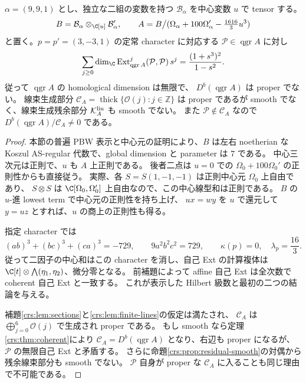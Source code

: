 \begin{proposition}
\label{cmo:prop:rational-singular}
$\alpha=(9,9,1)$ とし、独立な二組の変数を持つ
$\mathcal B_\alpha$ を中心変数 $u$ で tensor する。
\[
 B=\mathcal B_\alpha\otimes_{\C[u]}\mathcal B_\alpha',\qquad
 A=B\big/(\Omega_\alpha+100\Omega_\alpha'-\tfrac{1616}{3}u^3)
\]
と置く。$p=p'=(3,-3,1)$ の定常 character に対応する
$\mathcal P\in\operatorname{qgr}A$ に対し
\[
 \sum_{j\ge0}\dim_\C\operatorname{Ext}^j_{\operatorname{qgr}A}
       (\mathcal P,\mathcal P)\,s^j
 =\frac{(1+s^3)^2}{1-s^2}.
\]
従って $\operatorname{qgr}A$ の homological dimension は無限で、
$D^b(\operatorname{qgr}A)$ は proper でない。
線束生成部分 $\mathcal C_A=\operatorname{thick}\{\mathcal O(j):j\in\mathbb Z\}$ は
proper であるが smooth でなく、線束生成残余部分 $\mathcal K_A^{\rm lin}$ も smooth でない。
また $\mathcal P\notin\mathcal C_A$ なので
$D^b(\operatorname{qgr}A)/\mathcal C_A\ne0$ である。
\end{proposition}
\begin{proof}
本節の普遍 PBW 表示と中心元の証明により、$B$ は左右 noetherian な
Koszul AS-regular 代数で、global dimension と parameter は $7$ である。
中心三次元は正則で、$u$ も $A$ 上正則である。
後者二点は $u=0$ での $\Omega_0+100\Omega_0'$ の正則性からも直接従う。
実際、各 $S=S(1,-1,-1)$ は正則中心元 $\Omega_0$ 上自由であり、
$S\otimes S$ は $\C[\Omega_0,\Omega_0']$ 上自由なので、この中心線型和は正則である。
$B$ の $u$-進 lowest term で中心元の正則性を持ち上げ、
$u x=w y$ を $u$ で還元して $y=u z$ とすれば、$u$ の商上の正則性も得る。

指定 character では
\[
 (ab)^3+(bc)^3+(ca)^3=-729,\qquad
 9a^2b^2c^2=729,\qquad
 \kappa(p)=0,\quad\lambda_p=\frac{16}{3}.
\]
従って二因子の中心和はこの character を消し、自己 Ext の計算複体は
$\C[t]\otimes\bigwedge(\eta_1,\eta_2)$、微分零となる。
前補題によって affine 自己 Ext は全次数で coherent 自己 Ext と一致する。
これが表示した Hilbert 級数と最初の二つの結論を与える。

補題\ref{crs:lem:sections}と\ref{crs:lem:finite-lines}の仮定は満たされ、
$\mathcal C_A$ は $\bigoplus_{j=0}^6\mathcal O(j)$ で生成され proper である。
もし smooth なら定理\ref{crs:thm:coherent}により
$\mathcal C_A=D^b(\operatorname{qgr}A)$ となり、右辺も proper になるが、
$\mathcal P$ の無限自己 Ext と矛盾する。
さらに命題\ref{crs:prop:residual-smooth}の対偶から残余線束部分も smooth でない。
$\mathcal P$ 自身が proper な $\mathcal C_A$ に入ることも同じ理由で不可能である。
\end{proof}

